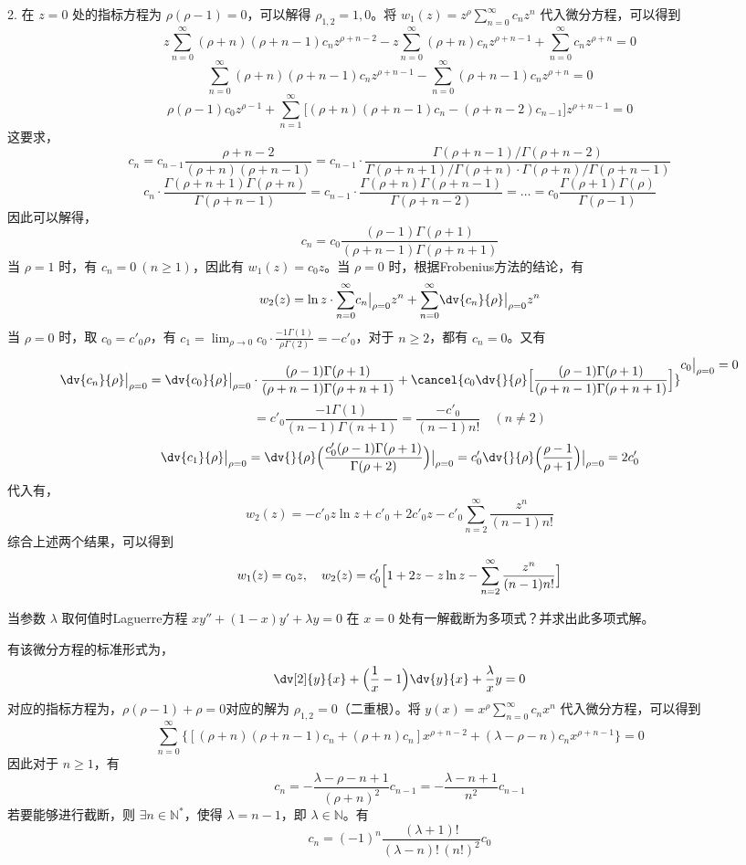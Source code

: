 \begin{question}
\begin{solution}
2. 在 \(z=0\) 处的指标方程为 \(\rho(\rho-1)=0\)，可以解得 \(\rho_{1,2}=1,0\)。将 \(w_1(z)=z^{\rho}\sum_{n=0}^\infty c_n z^n\) 代入微分方程，可以得到 \[ z\sum_{n=0}^\infty (\rho+n)(\rho+n-1)c_n z^{\rho+n-2}-z\sum_{n=0}^\infty (\rho+n)c_n z^{\rho+n-1}+\sum_{n=0}^\infty c_n z^{\rho+n}=0 \] \[ \sum_{n=0}^\infty (\rho+n)(\rho+n-1)c_n z^{\rho+n-1}-\sum_{n=0}^\infty (\rho+n-1)c_n z^{\rho+n}=0 \] \[ \rho(\rho-1)c_0 z^{\rho-1}+\sum_{n=1}^\infty \bigl[(\rho+n)(\rho+n-1)c_n-(\rho+n-2)c_{n-1}\bigr]z^{\rho+n-1}=0 \]这要求，\[ c_n = c_{n-1}\frac{\rho+n-2}{(\rho+n)(\rho+n-1)} = c_{n-1}\cdot\frac{\Gamma(\rho+n-1)/\Gamma(\rho+n-2)}{\Gamma(\rho+n+1)/\Gamma(\rho+n)\cdot\Gamma(\rho+n)/\Gamma(\rho+n-1)} \] \[ c_n\cdot\frac{\Gamma(\rho+n+1)\Gamma(\rho+n)}{\Gamma(\rho+n-1)} =c_{n-1}\cdot\frac{\Gamma(\rho+n)\Gamma(\rho+n-1)}{\Gamma(\rho+n-2)}=\dots =c_0\frac{\Gamma(\rho+1)\Gamma(\rho)}{\Gamma(\rho-1)} \]因此可以解得，\[ c_n = c_0\frac{(\rho-1)\Gamma(\rho+1)}{(\rho+n-1)\Gamma(\rho+n+1)} \]当 \(\rho=1\) 时，有 \(c_n=0\ (n\ge 1)\)，因此有 \(w_1(z)=c_0z\)。当 \(\rho=0\) 时，根据Frobenius方法的结论，有 \[ w_2(z)=\ln z\cdot\sum_{n=0}^\infty \bigl.c_n\bigr|_{\rho=0} z^{n}+\sum_{n=0}^\infty \bigl.\dv{c_n}{\rho}\bigr|_{\rho=0} z^{n} \]当 \(\rho=0\) 时，取 \(c_0=c'_0\rho\)，有 \(c_1=\displaystyle\lim_{\rho\to0} c_0\cdot\frac{-1\Gamma(1)}{\rho\Gamma(2)}=-c'_0\)，对于 \(n\ge 2\)，都有 \(c_n=0\)。又有 \[ \bigl.\dv{c_n}{\rho}\bigr|_{\rho=0} =\bigl.\dv{c_0}{\rho}\bigr|_{\rho=0}\cdot\frac{(\rho-1)\Gamma(\rho+1)}{(\rho+n-1)\Gamma(\rho+n+1)}+\cancel{c_0\dv{}{\rho}\Bigl[\frac{(\rho-1)\Gamma(\rho+1)}{(\rho+n-1)\Gamma(\rho+n+1)}\Bigr]}^{\displaystyle \bigl.c_0\bigr|_{\rho=0}=0} \] \[ =c'_0\frac{-1\Gamma(1)}{(n-1)\Gamma(n+1)}=\frac{-c'_0}{(n-1)n!}\quad (n\neq2) \] \[ \bigl.\dv{c_1}{\rho}\bigr|_{\rho=0} =\bigl.\dv{}{\rho}\Bigl(\frac{c'_0(\rho-1)\Gamma(\rho+1)}{\Gamma(\rho+2)}\Bigr)\bigr|_{\rho=0}=c'_0\bigl.\dv{}{\rho}\Bigl(\frac{\rho-1}{\rho+1}\Bigr)\bigr|_{\rho=0}=2c'_0 \]代入有，\[ w_2(z)=-c'_0 z\ln z+c'_0+2c'_0 z-c'_0\sum_{n=2}^\infty \frac{z^n}{(n-1)n!} \]综合上述两个结果，可以得到 \[ w_1(z)=c_0z,\quad w_2(z)=c'_0\Bigl[1+2z-z\ln z-\sum_{n=2}^\infty \frac{z^n}{(n-1)n!}\Bigr] \]
\end{solution}
\end{question}

\begin{question}
当参数 \(\lambda\) 取何值时Laguerre方程 \(x y''+(1-x)y'+\lambda y=0\) 在 \(x=0\) 处有一解截断为多项式？并求出此多项式解。
\begin{solution}
有该微分方程的标准形式为，\[ \dv[2]{y}{x}+\Bigl(\frac1x-1\Bigr)\dv{y}{x}+\frac{\lambda}{x}y=0 \]对应的指标方程为，\(\rho(\rho-1)+\rho=0\)对应的解为 \(\rho_{1,2}=0\)（二重根）。将 \(y(x)=x^\rho\sum_{n=0}^\infty c_n x^n\) 代入微分方程，可以得到\[ \sum_{n=0}^\infty \bigl\{[(\rho+n)(\rho+n-1)c_n+(\rho+n)c_n]x^{\rho+n-2}+(\lambda-\rho-n)c_n x^{\rho+n-1}\bigr\}=0 \]因此对于 \(n\ge1\)，有 \[ c_n =-\frac{\lambda-\rho-n+1}{(\rho+n)^2}c_{n-1}=-\frac{\lambda-n+1}{n^2}c_{n-1} \]若要能够进行截断，则 \(\exists n\in\mathbb{N}^*\)，使得 \(\lambda=n-1\)，即 \(\lambda\in\mathbb{N}\)。有 \[ c_n = (-1)^n \frac{(\lambda+1)!}{(\lambda-n)!\,(n!)^2} c_0
\]
\end{solution}
\end{question}

